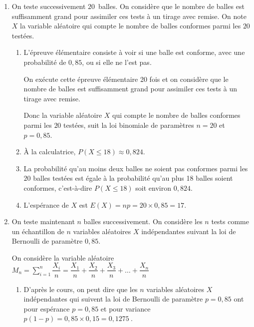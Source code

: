 \documentclass[10pt]{article}
\providecommand{\np}[2][]{{#2~#1}}
\providecommand{\ds}{\displaystyle}
\begin{document}
\begin{enumerate}
\item On teste successivement $20$~balles. On considère que le nombre de balles est suffisamment grand pour assimiler ces tests à un tirage avec remise. On note $X$ la variable aléatoire qui compte le nombre de balles conformes parmi les $20$ testées.
	\begin{enumerate}
		\item 
L'épreuve élémentaire consiste à voir si une balle est conforme, avec une probabilité de $0,85$, ou si elle ne l'est pas.

On exécute cette épreuve élémentaire 20 fois et on  considère que le nombre de balles est suffisamment grand pour assimiler ces tests à un tirage avec remise.

Donc la variable aléatoire $X$ qui compte le nombre de balles conformes parmi les $20$ testées, suit la loi binomiale de paramètres $n=20$ et $p=0,85$.
		
		\item À la calculatrice,  $P\left (X \leqslant 18\right ) \approx 0,824$.
		
		\item La probabilité qu'au moins deux balles ne soient pas conformes parmi les $20$ balles testées est  égale à la probabilité qu'au plus 18 balles soient conformes, c'est-à-dire $P\left (X\leqslant18\right )$ soit environ $0,824$.
		
		
		\item L'espérance de $X$ est $E(X)=np=20\times 0,85=17$.
	\end{enumerate}
	
\item On teste maintenant $n$ balles successivement. On considère les $n$ tests comme un échantillon de $n$ variables aléatoires $X$ indépendantes suivant la loi de Bernoulli de paramètre $0,85$.
	
On considère la variable aléatoire
	$M_n = \displaystyle\sum_{i=1}^n \dfrac{X_i}{n} = \dfrac{X_1}{n} + \dfrac{X_2}{n} + \dfrac{X_3}{n} + \ldots + \dfrac{X_n}{n}$

	\begin{enumerate}
		\item 
D'après le cours, on peut dire que les  $n$ variables aléatoires $X$ indépendantes qui suivent la loi de Bernoulli de paramètre $p=0,85$ ont pour espérance $p=0,85$ et pour variance $p\left (1-p\right )=0,85\times 0,15=\np{0,1275}$.

\end{enumerate}
\end{enumerate}
\end{document}
